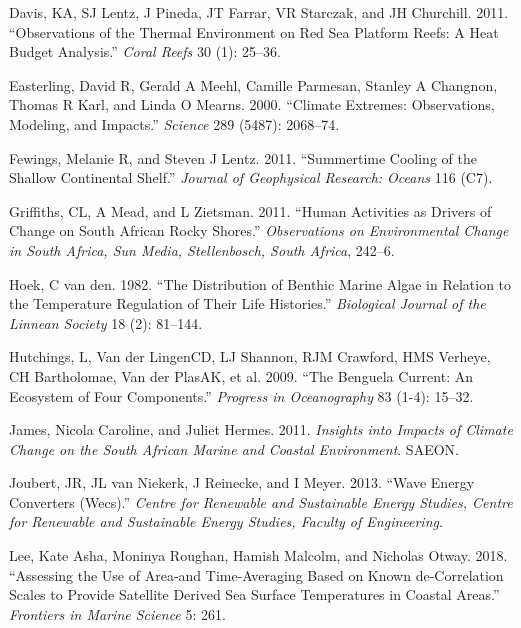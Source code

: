 \documentclass[12pt,a4paper,]{article}
\begin{document}
\leavevmode\hypertarget{ref-Davis2011}{}%
Davis, KA, SJ Lentz, J Pineda, JT Farrar, VR Starczak, and JH Churchill.
2011. ``Observations of the Thermal Environment on Red Sea Platform
Reefs: A Heat Budget Analysis.'' \emph{Coral Reefs} 30 (1): 25--36.

\leavevmode\hypertarget{ref-Easterling2000}{}%
Easterling, David R, Gerald A Meehl, Camille Parmesan, Stanley A
Changnon, Thomas R Karl, and Linda O Mearns. 2000. ``Climate Extremes:
Observations, Modeling, and Impacts.'' \emph{Science} 289 (5487):
2068--74.

\leavevmode\hypertarget{ref-Fewings2011}{}%
Fewings, Melanie R, and Steven J Lentz. 2011. ``Summertime Cooling of
the Shallow Continental Shelf.'' \emph{Journal of Geophysical Research:
Oceans} 116 (C7).

\leavevmode\hypertarget{ref-Griffiths2011}{}%
Griffiths, CL, A Mead, and L Zietsman. 2011. ``Human Activities as
Drivers of Change on South African Rocky Shores.'' \emph{Observations on
Environmental Change in South Africa, Sun Media, Stellenbosch, South
Africa}, 242--6.

\leavevmode\hypertarget{ref-Hoek1982}{}%
Hoek, C van den. 1982. ``The Distribution of Benthic Marine Algae in
Relation to the Temperature Regulation of Their Life Histories.''
\emph{Biological Journal of the Linnean Society} 18 (2): 81--144.

\leavevmode\hypertarget{ref-Hutchings2009}{}%
Hutchings, L, Van der LingenCD, LJ Shannon, RJM Crawford, HMS Verheye,
CH Bartholomae, Van der PlasAK, et al. 2009. ``The Benguela Current: An
Ecosystem of Four Components.'' \emph{Progress in Oceanography} 83
(1-4): 15--32.

\leavevmode\hypertarget{ref-James2011}{}%
James, Nicola Caroline, and Juliet Hermes. 2011. \emph{Insights into
Impacts of Climate Change on the South African Marine and Coastal
Environment}. SAEON.

\leavevmode\hypertarget{ref-Joubert2013}{}%
Joubert, JR, JL van Niekerk, J Reinecke, and I Meyer. 2013. ``Wave
Energy Converters (Wecs).'' \emph{Centre for Renewable and Sustainable
Energy Studies, Centre for Renewable and Sustainable Energy Studies,
Faculty of Engineering}.

\leavevmode\hypertarget{ref-Lee2018}{}%
Lee, Kate Asha, Moninya Roughan, Hamish Malcolm, and Nicholas Otway.
2018. ``Assessing the Use of Area-and Time-Averaging Based on Known
de-Correlation Scales to Provide Satellite Derived Sea Surface
Temperatures in Coastal Areas.'' \emph{Frontiers in Marine Science} 5:
261.
\end{document}
